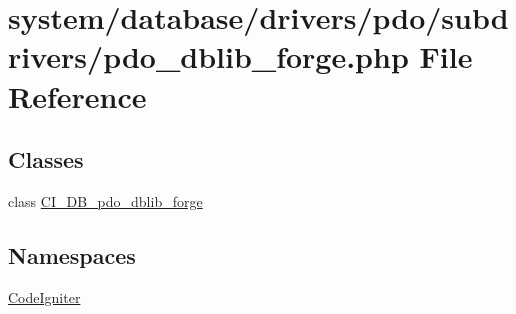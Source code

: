 \hypertarget{pdo__dblib__forge_8php}{}\section{system/database/drivers/pdo/subdrivers/pdo\+\_\+dblib\+\_\+forge.php File Reference}
\label{pdo__dblib__forge_8php}
\subsection*{Classes}
\begin{DoxyCompactItemize}
\item 
class \mbox{\hyperlink{class_c_i___d_b__pdo__dblib__forge}{C\+I\+\_\+\+D\+B\+\_\+pdo\+\_\+dblib\+\_\+forge}}
\end{DoxyCompactItemize}
\subsection*{Namespaces}
\begin{DoxyCompactItemize}
\item 
 \mbox{\hyperlink{namespace_code_igniter}{Code\+Igniter}}
\end{DoxyCompactItemize}
